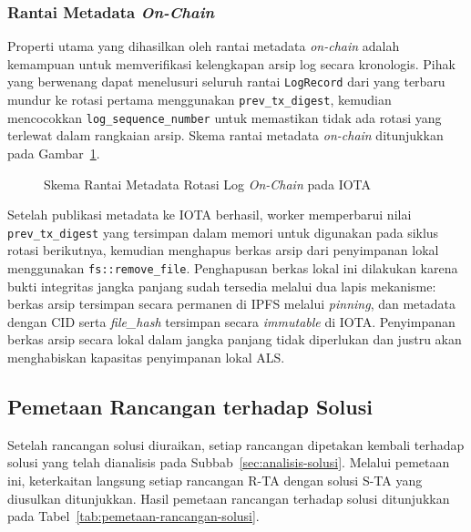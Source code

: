 \subsubsection{Rantai Metadata \textit{On-Chain}}

Properti utama yang dihasilkan oleh rantai metadata \textit{on-chain} adalah kemampuan untuk memverifikasi kelengkapan arsip log secara kronologis. Pihak yang berwenang dapat menelusuri seluruh rantai \texttt{LogRecord} dari yang terbaru mundur ke rotasi pertama menggunakan \texttt{prev\_tx\_digest}, kemudian mencocokkan \texttt{log\_sequence\_number} untuk memastikan tidak ada rotasi yang terlewat dalam rangkaian arsip. Skema rantai metadata \textit{on-chain} ditunjukkan pada Gambar~\ref{fig:rantai-metadata-onchain}.

\begin{figure}[htbp]
\centering
\caption{Skema Rantai Metadata Rotasi Log \textit{On-Chain} pada IOTA}
\label{fig:rantai-metadata-onchain}
\end{figure}

Setelah publikasi metadata ke IOTA berhasil, worker memperbarui nilai \texttt{prev\_tx\_digest} yang tersimpan dalam memori untuk digunakan pada siklus rotasi berikutnya, kemudian menghapus berkas arsip dari penyimpanan lokal menggunakan \texttt{fs::remove\_file}. Penghapusan berkas lokal ini dilakukan karena bukti integritas jangka panjang sudah tersedia melalui dua lapis mekanisme: berkas arsip tersimpan secara permanen di IPFS melalui \textit{pinning}, dan metadata dengan CID serta \textit{file\_hash} tersimpan secara \textit{immutable} di IOTA. Penyimpanan berkas arsip secara lokal dalam jangka panjang tidak diperlukan dan justru akan menghabiskan kapasitas penyimpanan lokal ALS.

\subsection{Pemetaan Rancangan terhadap Solusi}
\label{subsec:pemetaan-rancangan-solusi}

Setelah rancangan solusi diuraikan, setiap rancangan dipetakan kembali terhadap solusi yang telah dianalisis pada Subbab~\ref{sec:analisis-solusi}. Melalui pemetaan ini, keterkaitan langsung setiap rancangan R-TA dengan solusi S-TA yang diusulkan ditunjukkan. Hasil pemetaan rancangan terhadap solusi ditunjukkan pada Tabel~\ref{tab:pemetaan-rancangan-solusi}.

